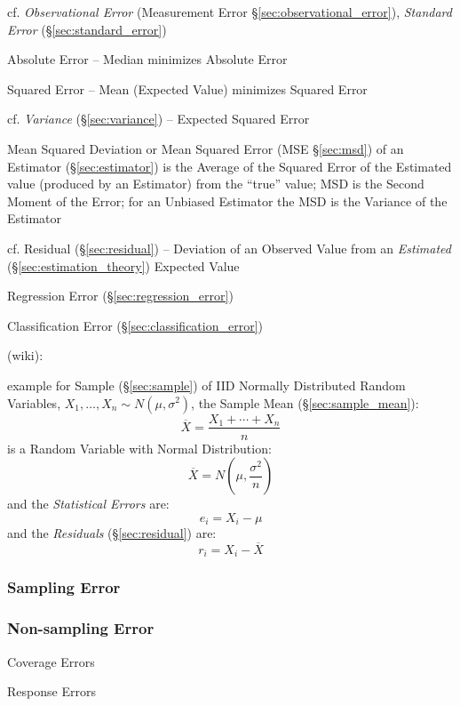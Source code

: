\fist cf. \emph{Observational Error} (Measurement Error
\S\ref{sec:observational_error}), \emph{Standard Error}
  (\S\ref{sec:standard_error})

Absolute Error -- Median minimizes Absolute Error

Squared Error -- Mean (Expected Value) minimizes Squared Error

cf. \emph{Variance} (\S\ref{sec:variance}) -- Expected Squared Error

\fist Mean Squared Deviation or Mean Squared Error (MSE \S\ref{sec:msd}) of an
Estimator (\S\ref{sec:estimator}) is the Average of the Squared Error of the
Estimated value (produced by an Estimator) from the ``true'' value; MSD is
the Second Moment of the Error; for an Unbiased Estimator the MSD is the
Variance of the Estimator

cf. Residual (\S\ref{sec:residual}) -- Deviation of an Observed Value from an
\emph{Estimated} (\S\ref{sec:estimation_theory}) Expected Value

\fist Regression Error (\S\ref{sec:regression_error})

\fist Classification Error (\S\ref{sec:classification_error})

(wiki):

example for Sample (\S\ref{sec:sample}) of IID Normally Distributed Random
Variables, $X_1, \ldots, X_n \sim N(\mu, \sigma^2)$, the Sample Mean
(\S\ref{sec:sample_mean}):
\[
  \overline{X} = \frac{X_1 + \cdots + X_n}{n}
\]
is a Random Variable with Normal Distribution:
\[
  \overline{X} = N(\mu, \frac{\sigma^2}{n})
\]
and the \emph{Statistical Errors} are:
\[
  e_i = X_i - \mu
\]
and the \emph{Residuals} (\S\ref{sec:residual}) are:
\[
  r_i = X_i - \overline{X}
\]



\subsubsection{Sampling Error}\label{sec:sampling_error}

\subsubsection{Non-sampling Error}\label{sec:nonsampling_error}

Coverage Errors

Response Errors



